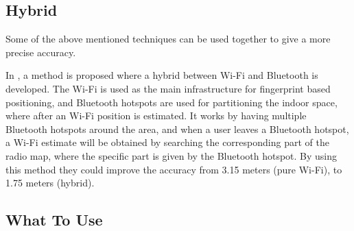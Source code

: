 \subsection{Hybrid}

Some of the above mentioned techniques can be used together to give a more precise accuracy. 

In \cite{aauhybrid}, a method is proposed where a hybrid between Wi-Fi and Bluetooth is developed. The Wi-Fi is used as the main infrastructure for fingerprint based positioning, and Bluetooth hotspots are used for partitioning the indoor space, where after an Wi-Fi position is estimated. It works by having multiple Bluetooth hotspots around the area, and when a user leaves a Bluetooth hotspot, a Wi-Fi estimate will be obtained by searching the corresponding part of the radio map, where the specific part is given by the Bluetooth hotspot. By using this method they could improve the accuracy from 3.15 meters (pure Wi-Fi), to 1.75 meters (hybrid). 




\subsection{What To Use} %
